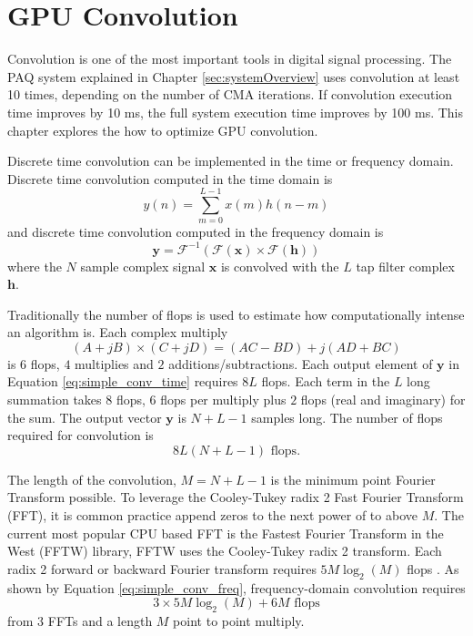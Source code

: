 \chapter{GPU Convolution}
\label{chap:gpu_convolution}
Convolution is one of the most important tools in digital signal processing.
The PAQ system explained in Chapter \ref{sec:systemOverview} uses convolution at least 10 times, depending on the number of CMA iterations.
If convolution execution time improves by 10 ms, the full system execution time improves by 100 ms.
This chapter explores the how to optimize GPU convolution.

Discrete time convolution can be implemented in the time or frequency domain. 
Discrete time convolution computed in the time domain is
\begin{equation}
y(n) = \sum^{L-1}_{m=0} x(m) h(n-m)
  \label{eq:simple_conv_time}
\end{equation}
and discrete time convolution computed in the frequency domain is
\begin{equation}
\mathbf{y} = \mathscr{F}^{-1}(\mathscr{F}(\mathbf{x})\times\mathscr{F}(\mathbf{h}))
  \label{eq:simple_conv_freq}
\end{equation}
where the $N$ sample complex signal $\mathbf{x}$ is convolved with the $L$ tap filter complex $\mathbf{h}$.

Traditionally the number of flops is used to estimate how computationally intense an algorithm is. 
Each complex multiply 
\begin{equation}
(A+jB)\times(C+jD) = (AC-BD)+j(AD+BC)
\end{equation}
is $6$ flops, $4$ multiplies and $2$ additions/subtractions.
Each output element of $\mathbf{y}$ in Equation \eqref{eq:simple_conv_time} requires $8L$ flops.
Each term in the $L$ long summation takes $8$ flops, $6$ flops per multiply plus $2$ flops (real and imaginary)  for the sum.
The output vector $\mathbf{y}$ is $N+L-1$ samples long.
The number of flops required for convolution is
\begin{equation}
8L(N+L-1) \text{ flops}.
\label{eq:flops_time_domain_conv}
\end{equation}

The length of the convolution, $M=N+L-1$ is the minimum point Fourier Transform possible.
To leverage the Cooley-Tukey radix 2 Fast Fourier Transform (FFT), it is common practice append zeros to the next power of to above $M$.
The current most popular CPU based FFT is the Fastest Fourier Transform in the West (FFTW) library, FFTW uses the Cooley-Tukey radix 2 transform.
Each radix 2 forward or backward Fourier transform requires $5M\log_2(M)$ flops \cite{FFTW:2017,cooley1965algorithm}.
As shown by Equation \ref{eq:simple_conv_freq}, frequency-domain convolution requires 
\begin{equation}
3\times5M\log_2(M)+6M \text{ flops}
\label{eq:flops_freq_domain_conv}
\end{equation}
from $3$ FFTs and a length $M$ point to point multiply.


